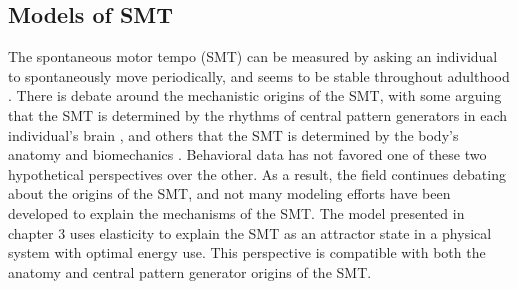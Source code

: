 \documentclass{report}
\begin{document}
\subsection{Models of SMT}
The spontaneous motor tempo (SMT) can be measured by asking an individual to spontaneously move periodically, and seems to be stable throughout adulthood \cite{scheurich2018tapping}. There is debate around the mechanistic origins of the SMT, with some arguing that the SMT is determined by the rhythms of central pattern generators in each individual's brain \cite{latash1992virtual}, and others that the SMT is determined by the body’s anatomy and biomechanics \cite{goodman2000advantages}. Behavioral data has not favored one of these two hypothetical perspectives over the other. As a result, the field continues debating about the origins of the SMT, and not many modeling efforts have been developed to explain the mechanisms of the SMT. The model presented in chapter 3 uses elasticity to explain the SMT as an attractor state in a physical system with optimal energy use. This perspective is compatible with both the anatomy and central pattern generator origins of the SMT. 
\end{document}
